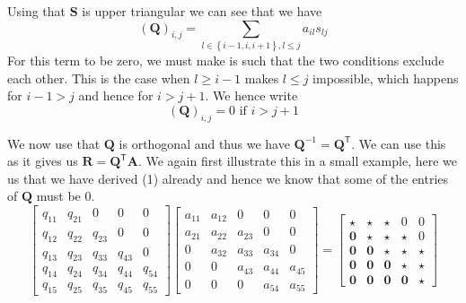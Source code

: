 \documentclass{article}
\begin{document}
Using that $\mathbf{S}$ is upper triangular we can see that we have
\begin{equation*}
    \left(\mathbf{Q}\right)_{i,j} = \sum_{l \in \left\{i - 1, i, i+1\right\}, l \leq j} a_{il}s_{lj}
\end{equation*}
For this term to be zero, we must make is such that the two conditions exclude each other. This is the case when $l \geq i - 1$ makes $l \leq j$ impossible, which happens for $i - 1 > j$ and hence for $i > j + 1$. We hence write
\begin{equation}
    \left(\mathbf{Q}\right)_{i,j} = 0 \text{ if } i > j + 1
\end{equation}

\noindent We now use that $\mathbf{Q}$ is orthogonal and thus we have $\mathbf{Q}^{-1} = \mathbf{Q}^{\mathsf{T}}$. We can use this as it gives us $\mathbf{R} = \mathbf{Q}^{\mathsf{T}}\mathbf{A}$. We again first illustrate this in a small example, here we us that we have derived (1) already and hence we know that some of the entries of $\mathbf{Q}$ must be $0$.
\begin{equation*}
    \begin{bmatrix}
        q_{11} & q_{21}  & 0 & 0 & 0 \\
        q_{12} & q_{22} & q_{23} & 0 & 0 \\
        q_{13} & q_{23} & q_{33} & q_{43} & 0 \\
        q_{14} & q_{24} & q_{34} & q_{44} & q_{54} \\
        q_{15} & q_{25} & q_{35} & q_{45} & q_{55}
    \end{bmatrix}
    \begin{bmatrix}
        a_{11} & a_{12} & 0 & 0 & 0\\
        a_{21} & a_{22} & a_{23} & 0 & 0 \\
        0 & a_{32} & a_{33} & a_{34} & 0 \\
        0 & 0 & a_{43} & a_{44} & a_{45} \\
        0 & 0 & 0 & a_{54} & a_{55}
    \end{bmatrix}
    = \begin{bmatrix}
        \star & \star & \star & 0 & 0 \\
        \mathbf{0} & \star& \star & \star & 0 \\
        \mathbf{0} & \mathbf{0} & \star & \star & \star \\
        \mathbf{0} & \mathbf{0} & \mathbf{0} & \star &\star \\
        \mathbf{0} & \mathbf{0} & \mathbf{0} & \mathbf{0} & \star
    \end{bmatrix}
\end{equation*}
\end{document}
